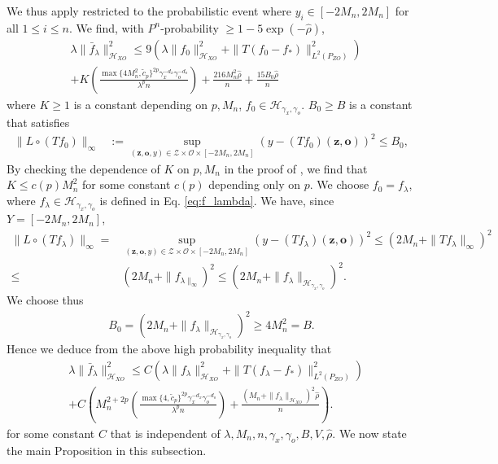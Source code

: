 \documentclass[11pt]{article}
\newcommand{\bz}{\mathbf z}
\newcommand{\bo}{\mathbf o}
\newcommand{\calZ}{\mathcal{Z}}
\newcommand{\calH}{\mathcal{H}}
\newcommand{\calO}{\mathcal{O}}
\newcommand{\0}{\mathbf{0}}
\begin{document}
\begin{appendix}
We thus apply \citet[Theorem 7.23]{steinwart2008support} restricted to the probabilistic event where $y_i\in [-2M_n, 2M_n]$ for all $1\leq i\leq n$. 
We find, with $P^{n}$-probability $\geq 1 - 5\exp(-\hat{\rho})$, 
\begin{align*}
    &\lambda \|\bar{f}_{\lambda}\|^2_{\calH_{XO}}\leq 9\left(\lambda \|f_0\|^2_{\calH_{XO}} + \|T(f_0 - f_{\ast})\|^2_{L^2(P_{ZO})}\right) \\ & + K\left(\frac{\max\{4M_n^2, \tilde{c}_{p}\}^{2p}\gamma_x^{-d_x}\gamma_o^{-d_o}}{\lambda^p n}\right) + \frac{216M_n^2 \hat{\rho}}{n} + \frac{15B_0\hat{\rho}}{n}
\end{align*}
where $K\geq 1$ is a constant depending on $p, M_n$, $f_0\in \calH_{\gamma_x,\gamma_o}$. $B_0\geq B$ is a constant that satisfies
\begin{align*}
    \|L\circ (Tf_{0})\|_{\infty} &:= \sup_{(\bz,\bo,y)\in \calZ\times \calO\times [-2M_n, 2M_n]}(y - (Tf_0)(\bz,\bo))^2 \leq B_0,
\end{align*}
By checking the dependence of $K$ on $p, M_n$ in the proof of \citet[Theorem 7.23]{steinwart2008support}, we find that $K\leq c(p)M_n^2$ for some constant $c(p)$ depending only on $p$. 
We choose $f_0 = f_{\lambda}$, where $f_{\lambda} \in \calH_{\gamma_x,\gamma_o}$ is defined in Eq. \eqref{eq:f_lambda}. We have, since $Y = [-2M_n, 2M_n]$, 
\begin{align*}
    \|L\circ (Tf_{\lambda})\|_{\infty} = & \sup_{(\bz,\bo,y)\in \calZ\times \calO\times [-2M_n, 2M_n]} (y - (Tf_{\lambda})(\bz,\bo))^2 
    \leq  (2M_n + \|Tf_{\lambda}\|_{\infty})^2 \\ \leq & (2M_n + \|f_{\lambda\|_{\infty}})^2 \leq (2M_n + \|f_{\lambda}\|_{\calH_{\gamma_x,\gamma_o}})^2 .
\end{align*}
We choose thus 
\begin{align*}
    B_0  = (2M_n + \|f_{\lambda}\|_{\calH_{\gamma_x,\gamma_o}})^2 \geq 4M_n^2 = B.
\end{align*}
Hence we deduce from the above high probability inequality that
\begin{align*}
    &\lambda \|\bar{f}_{\lambda}\|^2_{\calH_{XO}}\leq C\left(\lambda \|f_{\lambda}\|^2_{\calH_{XO}} + \|T(f_{\lambda} - f_{\ast})\|^2_{L^2(P_{ZO})}\right) \\ & + C\left( M_n^{2+2p}\left(\frac{\max\{4, \tilde{c}_{p}\}^{2p}\gamma_x^{-d_x}\gamma_o^{-d_o}}{\lambda^p n}\right) + \frac{(M_n + \|f_{\lambda}\|_{\calH_{XO}})^2 \hat{\rho}}{n}\right) .
\end{align*}
for some constant $C$ that is independent of $\lambda, M_n, n, \gamma_x,\gamma_o, B, V, \hat{\rho}$. We now state the main Proposition in this subsection. 

\end{appendix}
\end{document}
